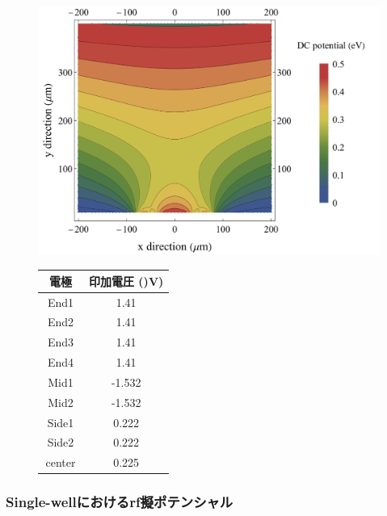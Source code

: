 \begin{figure}[h]
	\begin{center}
		\begin{minipage}{0.45\linewidth}
			\begin{center}
				\includegraphics[width = 1.2\columnwidth]{./theory/figure/dc_potential_example.png}
			\end{center}
		\end{minipage}
		\begin{minipage}{0.45\linewidth}
			\begin{center}
			\begin{tabular}{c|c} \hline \hline
				電極　& 印加電圧 ()V) \\ \hline
				End1 & 1.41 \\ \hline
				End2 & 1.41 \\ \hline
				End3 & 1.41 \\ \hline
				End4 & 1.41 \\ \hline
				Mid1 & -1.532 \\ \hline
				Mid2 & -1.532 \\ \hline
				Side1 & 0.222 \\ \hline
				Side2 & 0.222 \\ \hline
				center & 0.225 \\ \hline
			\end{tabular}
			\end{center}
		\end{minipage}
	\end{center}
\end{figure}
\subsubsection{Single-wellにおけるrf擬ポテンシャル}
